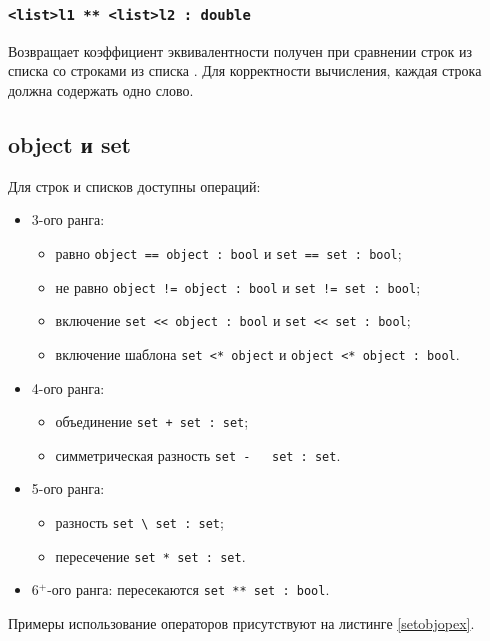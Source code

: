 \documentclass[a4paper, 14pt]{extarticle}
\newenvironment{icItems}
	{ \begin{itemize} [noitemsep,nolistsep] }
	{ \end{itemize} }
\begin{document}
\subsubsection{\lstinline`<list>l1 ** <list>l2 : double`}

Возвращает коэффициент эквивалентности получен при сравнении строк из списка  со строками из списка .
Для корректности вычисления, каждая строка должна содержать одно слово.

\subsection{{\color{bluemarin}object} и {\color{bluemarin}set}}

Для строк и списков доступны операций:
\begin{icItems}
	\item
		3-ого ранга:
		\begin{icItems}
		\item
			равно \lstinline`object == object : bool` и \lstinline`set == set : bool`;
		\item
			не равно \lstinline`object != object : bool` и \lstinline`set != set : bool`;
		\item
			включение \lstinline`set << object : bool` и \lstinline|set << set : bool|;
		\item
			включение шаблона \lstinline`set <* object` и \lstinline`object <* object : bool`.
		\end{icItems}
	\item
		4-ого ранга:
		\begin{icItems}
		\item
			объединение \lstinline`set + set : set`;
		\item
			симметрическая разность \lstinline`set -   set : set`.
		\end{icItems}
	\item
		5-ого ранга:
		\begin{icItems}
		\item
			разность \lstinline`set \ set : set`;
		\item
			пересечение \lstinline`set * set : set`.
		\end{icItems}
	\item
		6$^+$-ого ранга: пересекаются \lstinline|set ** set : bool|.
\end{icItems}

Примеры использование операторов присутствуют на листинге \ref{setobjopex}.
\end{document}
